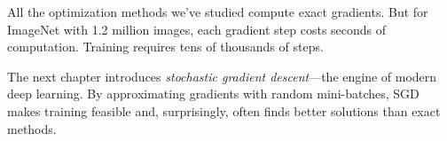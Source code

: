  All the optimization methods we've studied compute exact gradients. But for ImageNet with 1.2 million images, each gradient step costs seconds of computation. Training requires tens of thousands of steps.

The next chapter introduces \emph{stochastic gradient descent}---the engine of modern deep learning. By approximating gradients with random mini-batches, SGD makes training feasible and, surprisingly, often finds better solutions than exact methods.



